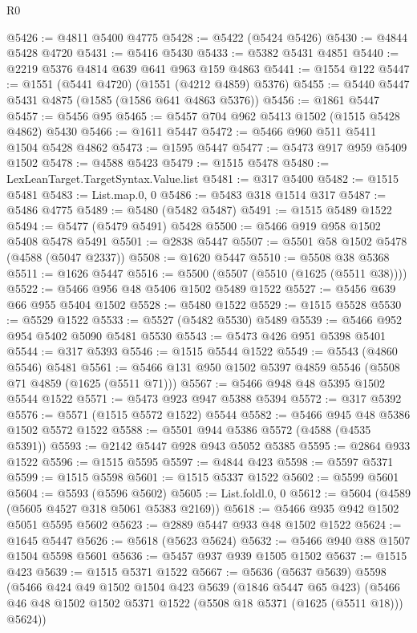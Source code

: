 \begin{lexlean}{R0}
\begin{coremodule}
@5426 := @4811 @5400 @4775
@5428 := @5422 (@5424 @5426)
@5430 := @4844 @5428 @4720
@5431 := @5416 @5430
@5433 := @5382 @5431 @4851
@5440 := @2219 @5376 @4814 @639 @641 @963 @159 @4863
@5441 := @1554 @122
@5447 := @1551 (@5441 @4720) (@1551 (@4212 @4859) @5376)
@5455 := @5440 @5447 @5431 @4875 (@1585 (@1586 @641 @4863 @5376))
@5456 := @1861 @5447
@5457 := @5456 @95
@5465 := @5457 @704 @962 @5413 @1502 (@1515 @5428 @4862) @5430
@5466 := @1611 @5447
@5472 := @5466 @960 @511 @5411 @1504 @5428 @4862
@5473 := @1595 @5447
@5477 := @5473 @917 @959 @5409 @1502
@5478 := @4588 @5423
@5479 := @1515 @5478
@5480 := LexLeanTarget.TargetSyntax.Value.list
@5481 := @317 @5400
@5482 := @1515 @5481
@5483 := List.map.{0, 0}
@5486 := @5483 @318 @1514 @317
@5487 := @5486 @4775
@5489 := @5480 (@5482 @5487)
@5491 := @1515 @5489 @1522
@5494 := @5477 (@5479 @5491) @5428
@5500 := @5466 @919 @958 @1502 @5408 @5478 @5491
@5501 := @2838 @5447
@5507 := @5501 @58 @1502 @5478 (@4588 (@5047 @2337))
@5508 := @1620 @5447
@5510 := @5508 @38 @5368
@5511 := @1626 @5447
@5516 := @5500 (@5507 (@5510 (@1625 (@5511 @38))))
@5522 := @5466 @956 @48 @5406 @1502 @5489 @1522
@5527 := @5456 @639 @66 @955 @5404 @1502
@5528 := @5480 @1522
@5529 := @1515 @5528
@5530 := @5529 @1522
@5533 := @5527 (@5482 @5530) @5489
@5539 := @5466 @952 @954 @5402 @5090 @5481 @5530
@5543 := @5473 @426 @951 @5398 @5401
@5544 := @317 @5393
@5546 := @1515 @5544 @1522
@5549 := @5543 (@4860 @5546) @5481
@5561 := @5466 @131 @950 @1502 @5397 @4859 @5546 (@5508 @71 @4859 (@1625 (@5511 @71)))
@5567 := @5466 @948 @48 @5395 @1502 @5544 @1522
@5571 := @5473 @923 @947 @5388 @5394
@5572 := @317 @5392
@5576 := @5571 (@1515 @5572 @1522) @5544
@5582 := @5466 @945 @48 @5386 @1502 @5572 @1522
@5588 := @5501 @944 @5386 @5572 (@4588 (@4535 @5391))
@5593 := @2142 @5447 @928 @943 @5052 @5385
@5595 := @2864 @933 @1522
@5596 := @1515 @5595
@5597 := @4844 @423
@5598 := @5597 @5371
@5599 := @1515 @5598
@5601 := @1515 @5337 @1522
@5602 := @5599 @5601
@5604 := @5593 (@5596 @5602)
@5605 := List.foldl.{0, 0}
@5612 := @5604 (@4589 (@5605 @4527 @318 @5061 @5383 @2169))
@5618 := @5466 @935 @942 @1502 @5051 @5595 @5602
@5623 := @2889 @5447 @933 @48 @1502 @1522
@5624 := @1645 @5447
@5626 := @5618 (@5623 @5624)
@5632 := @5466 @940 @88 @1507 @1504 @5598 @5601
@5636 := @5457 @937 @939 @1505 @1502
@5637 := @1515 @423
@5639 := @1515 @5371 @1522
@5667 := @5636
    (@5637 @5639)
    @5598
    (@5466
      @424
      @49
      @1502
      @1504
      @423
      @5639
      (@1846 @5447 @65 @423)
      (@5466 @46 @48 @1502 @1502 @5371 @1522 (@5508 @18 @5371 (@1625 (@5511 @18))) @5624))

\end{coremodule}
\end{lexlean}
